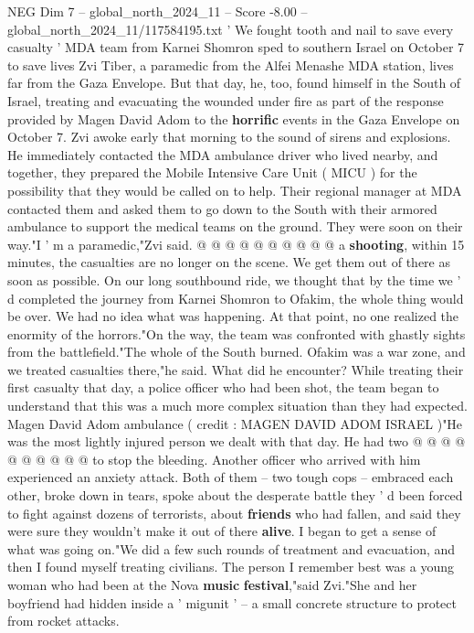 \begin{textsample}{NEG Dim 7 – global\_north\_2024\_11 – Score -8.00 – global\_north\_2024\_11/117584195.txt}  \label{ex:f7_neg_251}
' We fought tooth and nail to save every casualty ' MDA team from Karnei Shomron sped to southern Israel on October 7 to save lives Zvi Tiber, a paramedic from the Alfei Menashe MDA station, lives far from the Gaza Envelope.
But that day, he, too, found himself in the South of Israel, treating and evacuating the wounded under fire as part of the response provided by Magen David Adom to the \textbf{horrific} events in the Gaza Envelope on October 7.
Zvi awoke early that morning to the sound of sirens and explosions.
He immediately contacted the MDA ambulance driver who lived nearby, and together, they prepared the Mobile Intensive Care Unit ( MICU ) for the possibility that they would be called on to help.
Their regional manager at MDA contacted them and asked them to go down to the South with their armored ambulance to support the medical teams on the ground.
They were soon on their way."I ' m a paramedic,"Zvi said. @ @ @ @ @ @ @ @ @ @ a \textbf{shooting}, within 15 minutes, the casualties are no longer on the scene.
We get them out of there as soon as possible.
On our long southbound ride, we thought that by the time we ' d completed the journey from Karnei Shomron to Ofakim, the whole thing would be over.
We had no idea what was happening.
At that point, no one realized the enormity of the horrors."On the way, the team was confronted with ghastly sights from the battlefield."The whole of the South burned.
Ofakim was a war zone, and we treated casualties there,"he said.
What did he encounter?
While treating their first casualty that day, a police officer who had been shot, the team began to understand that this was a much more complex situation than they had expected.
Magen David Adom ambulance ( credit : MAGEN DAVID ADOM ISRAEL )"He was the most lightly injured person we dealt with that day.
He had two @ @ @ @ @ @ @ @ @ @ to stop the bleeding.
Another officer who arrived with him experienced an anxiety attack.
Both of them -- two tough cops -- embraced each other, broke down in tears, spoke about the desperate battle they ' d been forced to fight against dozens of terrorists, about \textbf{friends} who had fallen, and said they were sure they wouldn't make it out of there \textbf{alive}.
I began to get a sense of what was going on."We did a few such rounds of treatment and evacuation, and then I found myself treating civilians.
The person I remember best was a young woman who had been at the Nova \textbf{music} \textbf{festival},"said Zvi."She and her boyfriend had hidden inside a ' migunit ' -- a small concrete structure to protect from rocket attacks.

\end{textsample}
